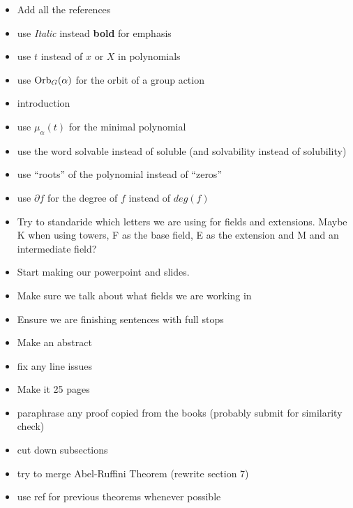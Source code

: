\begin{itemize}
    \item Add all the references
    \item use \textit{Italic} instead \textbf{bold} for emphasis
    \item use $t$ instead of $x$ or $X$ in polynomials
    \item use $\operatorname{Orb}_G(\alpha)$ for the orbit of a group action
    \item introduction
    \item use $\mu_{\alpha}(t)$ for the minimal polynomial
    \item use the word solvable instead of soluble (and solvability instead of solubility)
    \item use ``roots'' of the polynomial instead of ``zeros''
    \item use $\partial f$ for the degree of $f$ instead of $deg(f)$
    \item Try to standaride which letters we are using for fields and extensions. Maybe K when using towers, F as the base field, E as the extension and M and an intermediate field?
    \item Start making our powerpoint and slides.
    \item Make sure we talk about what fields we are working in
    \item Ensure we are finishing sentences with full stops
    \item Make an abstract
    \item fix any line issues
    \item Make it 25 pages
    \item paraphrase any proof copied from the books (probably submit for similarity check)
    \item cut down subsections
    \item try to merge Abel-Ruffini Theorem (rewrite section 7)
    \item use ref for previous theorems whenever possible
\end{itemize}
